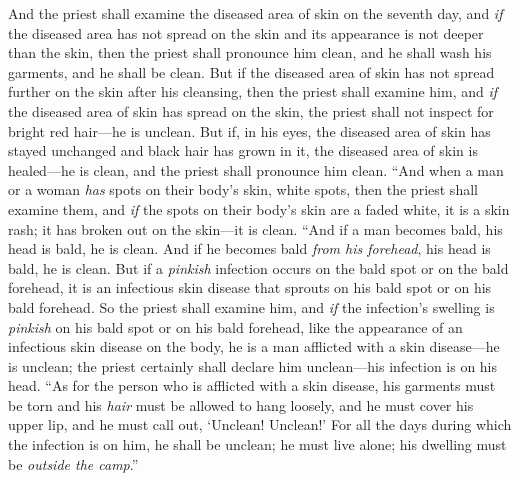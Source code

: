 \begin{biblechapter}
\verse And the priest shall examine the diseased area of skin on the seventh day, and \textit{if} the diseased area has not spread on the skin and its appearance is not deeper than the skin, then the priest shall pronounce him clean, and he shall wash his garments, and he shall be clean.
\verse But if the diseased area of skin has not spread further on the skin after his cleansing,
\verse then the priest shall examine him, and \textit{if} the diseased area of skin has spread on the skin, the priest shall not inspect for bright red hair—he is unclean.
\verse But if, in his eyes, the diseased area of skin has stayed unchanged and black hair has grown in it, the diseased area of skin is healed—he is clean, and the priest shall pronounce him clean.
\verse “And when a man or a woman \textit{has} spots on their body’s skin, white spots,
\verse then the priest shall examine them, and \textit{if} the spots on their body’s skin are a faded white, it is a skin rash; it has broken out on the skin—it is clean.
\verse “And if a man becomes bald, his head is bald, he is clean.
\verse And if he becomes bald \textit{from his forehead}, his head is bald, he is clean.
\verse But if a \textit{pinkish} infection occurs on the bald spot or on the bald forehead, it is an infectious skin disease that sprouts on his bald spot or on his bald forehead.
\verse So the priest shall examine him, and \textit{if} the infection’s swelling is \textit{pinkish} on his bald spot or on his bald forehead, like the appearance of an infectious skin disease on the body,
\verse he is a man afflicted with a skin disease—he is unclean; the priest certainly shall declare him unclean—his infection is on his head.
\verse “As for the person who is afflicted with a skin disease, his garments must be torn and his \textit{hair} must be allowed to hang loosely, and he must cover his upper lip, and he must call out, ‘Unclean! Unclean!’
\verse For all the days during which the infection is on him, he shall be unclean; he must live alone; his dwelling must be \textit{outside the camp}.”

\end{biblechapter}
